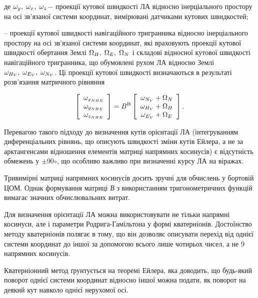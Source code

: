 де  $\omega 
_{y_{{\rm }} } ,{\rm \; }\omega_{x_{{\rm }} } ,{\rm \; }\omega_{z_{{\rm }} } $$-$ проекції 
кутової швидкості ЛА відносно інерціального простору на осі зв'язаної системи координат, 
вимірювані датчиками кутових швидкостей;


-- проекції кутової швидкості навігаційного тригранника 
відносно інерціального простору на осі зв'язаної системи координат, які враховують 
проекції кутової швидкості обертання Землі  $\Omega_{H} ,{\rm \; }\Omega_{E} ,{
\rm \; }\Omega_{N} $  і складові відносної кутової швидкості навігаційного тригранника, 
що обумовлені рухом ЛА відносно Землі $\omega_{H_{V} } ,{\rm \; }\omega_{E_{V} 
} ,{\rm \; }\omega_{N_{V} } $. Ці проекції кутової швидкості визначаються в результаті 
розв'язання матричного рівняння 

\[\left[\begin{array}{c} {\omega_{x_{NHE} } } \\ {\omega_{y_{NHE} } } \\ {\omega 
_{z_{NHE} } } \end{array}\right]=B^{{\rm B}} \left[\begin{array}{c} {\omega_{N_{V} 
} +\Omega_{N} } \\ {\omega_{H_{V} } +\Omega_{H} } \\ {\omega_{E_{V} } +\Omega 
_{E} } \end{array}\right] .\] 

Перевагою такого підходу до визначення кутів орієнтації ЛА (інтегруванням диференціальних 
рівнянь, що описують швидкості зміни кутів Ейлера, а не за арктангенсами відношення 
елементів матриці напрямних  косинусів) є відсутність обмежень у $\pm$90$\circ$, 
що особливо важливо при визначенні курсу ЛА на віражах. 

Тривимірні матриці напрямних  косинусів досить зручні для обчислень у бортовій ЦОМ. 
Однак формування матриці \textit{В} з використанням тригонометричних функцій вимагає 
значних обчислювальних витрат. 

Для визначення орієнтації ЛА можна використовувати не тільки напрямні косинуси, але 
і параметри Родрига-Гамільтона у формі кватерніонів. Достоїнство методу кватерніонів 
полягає в тому, що він дозволяє описувати перехід від однієї системи координат до 
іншої за допомогою всього лише чотирьох чисел, а не 9 напрямних  косинусів.

Кватерніонний метод ґрунтується  на теоремі Ейлера, яка доводить, що будь-який поворот 
однієї системи координат відносно іншої можна подати, як поворот на деякий кут навколо 
однієї нерухомої осі.

